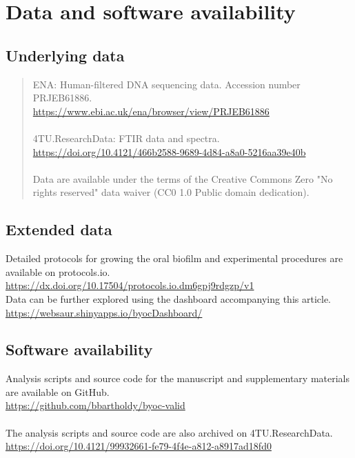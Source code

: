 \documentclass[10pt,a4paper]{article}
\begin{document}
\section*{Data and software availability} %
\subsection*{Underlying data}
\begin{quote}
ENA: Human-filtered DNA sequencing data. Accession number PRJEB61886.\\
\href{https://www.ebi.ac.uk/ena/browser/view/PRJEB61886}{https://www.ebi.ac.uk/ena/browser/view/PRJEB61886}
\\
\\
4TU.ResearchData: FTIR data and spectra.\\
\href{https://doi.org/10.4121/466b2588-9689-4d84-a8a0-5216aa39e40b}{https://doi.org/10.4121/466b2588-9689-4d84-a8a0-5216aa39e40b}
\\
\\
Data are available under the terms of the Creative Commons Zero "No rights reserved" data waiver (CC0 1.0 Public domain dedication).
\end{quote}

\subsection*{Extended data}
Detailed protocols for growing the oral biofilm and experimental procedures are available on protocols.io.\\
\href{https://dx.doi.org/10.17504/protocols.io.dm6gpj9rdgzp/v1}{https://dx.doi.org/10.17504/protocols.io.dm6gpj9rdgzp/v1}\\

Data can be further explored using the dashboard accompanying this article.\\
\href{https://websaur.shinyapps.io/byocDashboard/}{https://websaur.shinyapps.io/byocDashboard/}

\subsection*{Software availability}
Analysis scripts and source code for the manuscript and supplementary materials
are available on GitHub.\\
\href{https://github.com/bbartholdy/byoc-valid}{https://github.com/bbartholdy/byoc-valid}\\
\\
The analysis scripts and source code are also archived on 4TU.ResearchData.\\
\href{https://doi.org/10.4121/99932661-fe79-4f4e-a812-a8917ad18fd0}{https://doi.org/10.4121/99932661-fe79-4f4e-a812-a8917ad18fd0}
\end{document}
